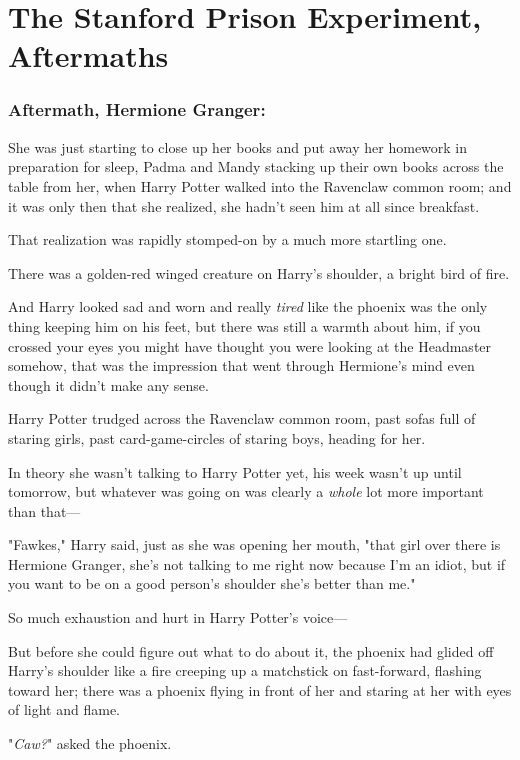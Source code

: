 \chapter{The Stanford Prison Experiment, Aftermaths}

\subsection{Aftermath, Hermione Granger:}

She was just starting to close up her books and put away her homework in
preparation for sleep, Padma and Mandy stacking up their own books across the
table from her, when Harry Potter walked into the Ravenclaw common room; and it
was only then that she realized, she hadn't seen him at all since breakfast.

That realization was rapidly stomped-on by a much more startling one.

There was a golden-red winged creature on Harry's shoulder, a bright bird of
fire.

And Harry looked sad and worn and really \emph{tired} like the phoenix was the
only thing keeping him on his feet, but there was still a warmth about him, if
you crossed your eyes you might have thought you were looking at the Headmaster
somehow, that was the impression that went through Hermione's mind even though
it didn't make any sense.

Harry Potter trudged across the Ravenclaw common room, past sofas full of
staring girls, past card-game-circles of staring boys, heading for her.

In theory she wasn't talking to Harry Potter yet, his week wasn't up until
tomorrow, but whatever was going on was clearly a \emph{whole} lot more
important than that—

"Fawkes," Harry said, just as she was opening her mouth, "that girl over there
is Hermione Granger, she's not talking to me right now because I'm an idiot,
but if you want to be on a good person's shoulder she's better than me."

So much exhaustion and hurt in Harry Potter's voice—

But before she could figure out what to do about it, the phoenix had glided off
Harry's shoulder like a fire creeping up a matchstick on fast-forward, flashing
toward her; there was a phoenix flying in front of her and staring at her with
eyes of light and flame.

"\emph{Caw?}" asked the phoenix.

